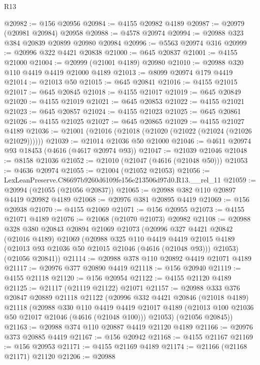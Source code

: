 \begin{lexlean}{R13}
\begin{coremodule}
@20982 := @156 @20956
@20984 := @4155 @20982 @4189
@20987 := @20979 (@20981 @20984) @20958
@20988 := @4578 @20974
@20994 := @20988 @323 @384 @20839 @20899 @20980 @20984
@20996 := @5563 @20974 @316
@20999 := @20996 @322 @4421 @20838
@21000 := @645 @20837
@21001 := @4155 @21000
@21004 := @20999 (@21001 @4189) @20980
@21010 := @20988 @320 @110 @4419 @4419 @21000 @4189
@21013 := @8099 @20974 @179 @4419
@21014 := @21013 @50
@21015 := @645 @20841
@21016 := @4155 @21015
@21017 := @645 @20845
@21018 := @4155 @21017
@21019 := @645 @20849
@21020 := @4155 @21019
@21021 := @645 @20853
@21022 := @4155 @21021
@21023 := @645 @20857
@21024 := @4155 @21023
@21025 := @645 @20861
@21026 := @4155 @21025
@21027 := @645 @20865
@21029 := @4155 @21027 @4189
@21036 := @21001 (@21016 (@21018 (@21020 (@21022 (@21024 (@21026 @21029))))))
@21039 := @21014 @21036 @50 @21000
@21046 := @4611 @20974 @93 @18453 (@4616 (@4617 @20974 @93))
@21047 := @21039 @21046
@21048 := @8158 @21036
@21052 := @21010 (@21047 (@4616 (@21048 @50)))
@21053 := @4636 @20974
@21055 := @21004 (@21052 @21053)
@21056 := LexLeanPreserve.C86697b9260d6109fe156e213506d97d0.R13.__rel_11
@21059 := @20994 (@21055 (@21056 @20837))
@21065 := @20988 @382 @110 @20897 @4419 @20982 @4189
@21068 := @20976 @381 @20895 @4419
@21069 := @156 @20938
@21070 := @4155 @21069
@21071 := @156 @20955
@21073 := @4155 @21071 @4189
@21076 := @21068 (@21070 @21073) @20982
@21108 := @20988
    @328
    @380
    @20843
    @20894
    @21069
    @21073
    (@20996
      @327
      @4421
      @20842
      (@21016 @4189)
      @21069
      (@20988
        @325
        @110
        @4419
        @4419
        @21015
        @4189
        (@21013 @93 @21036 @50 @21015 @21046 (@4616 (@21048 @93)))
        @21053)
      (@21056 @20841))
@21114 := @20988 @378 @110 @20892 @4419 @21071 @4189
@21117 := @20976 @377 @20890 @4419
@21118 := @156 @20940
@21119 := @4155 @21118
@21120 := @156 @20954
@21122 := @4155 @21120 @4189
@21125 := @21117 (@21119 @21122) @21071
@21157 := @20988
    @333
    @376
    @20847
    @20889
    @21118
    @21122
    (@20996
      @332
      @4421
      @20846
      (@21018 @4189)
      @21118
      (@20988
        @330
        @110
        @4419
        @4419
        @21017
        @4189
        (@21013 @100 @21036 @50 @21017 @21046 (@4616 (@21048 @100)))
        @21053)
      (@21056 @20845))
@21163 := @20988 @374 @110 @20887 @4419 @21120 @4189
@21166 := @20976 @373 @20885 @4419
@21167 := @156 @20942
@21168 := @4155 @21167
@21169 := @156 @20953
@21171 := @4155 @21169 @4189
@21174 := @21166 (@21168 @21171) @21120
@21206 := @20988

\end{coremodule}
\end{lexlean}
